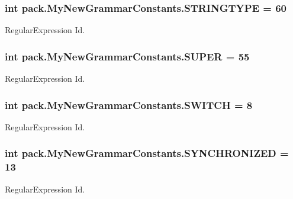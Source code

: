 \subsubsection[{\texorpdfstring{S\+T\+R\+I\+N\+G\+T\+Y\+PE}{STRINGTYPE}}]{\setlength{\rightskip}{0pt plus 5cm}int pack.\+My\+New\+Grammar\+Constants.\+S\+T\+R\+I\+N\+G\+T\+Y\+PE = 60}\hypertarget{interfacepack_1_1_my_new_grammar_constants_aed3fd7ad5e22a0abd6660c6ef21ec15c}{}\label{interfacepack_1_1_my_new_grammar_constants_aed3fd7ad5e22a0abd6660c6ef21ec15c}
Regular\+Expression Id. 
\subsubsection[{\texorpdfstring{S\+U\+P\+ER}{SUPER}}]{\setlength{\rightskip}{0pt plus 5cm}int pack.\+My\+New\+Grammar\+Constants.\+S\+U\+P\+ER = 55}\hypertarget{interfacepack_1_1_my_new_grammar_constants_a2bdcba4e86d5ef9fd1d93204448f8463}{}\label{interfacepack_1_1_my_new_grammar_constants_a2bdcba4e86d5ef9fd1d93204448f8463}
Regular\+Expression Id. 
\subsubsection[{\texorpdfstring{S\+W\+I\+T\+CH}{SWITCH}}]{\setlength{\rightskip}{0pt plus 5cm}int pack.\+My\+New\+Grammar\+Constants.\+S\+W\+I\+T\+CH = 8}\hypertarget{interfacepack_1_1_my_new_grammar_constants_a2fbb0554ebe6e072914cd766dc744f46}{}\label{interfacepack_1_1_my_new_grammar_constants_a2fbb0554ebe6e072914cd766dc744f46}
Regular\+Expression Id. 
\subsubsection[{\texorpdfstring{S\+Y\+N\+C\+H\+R\+O\+N\+I\+Z\+ED}{SYNCHRONIZED}}]{\setlength{\rightskip}{0pt plus 5cm}int pack.\+My\+New\+Grammar\+Constants.\+S\+Y\+N\+C\+H\+R\+O\+N\+I\+Z\+ED = 13}\hypertarget{interfacepack_1_1_my_new_grammar_constants_af1972bfa17823c549c0be01ac34a5187}{}\label{interfacepack_1_1_my_new_grammar_constants_af1972bfa17823c549c0be01ac34a5187}
Regular\+Expression Id. 
